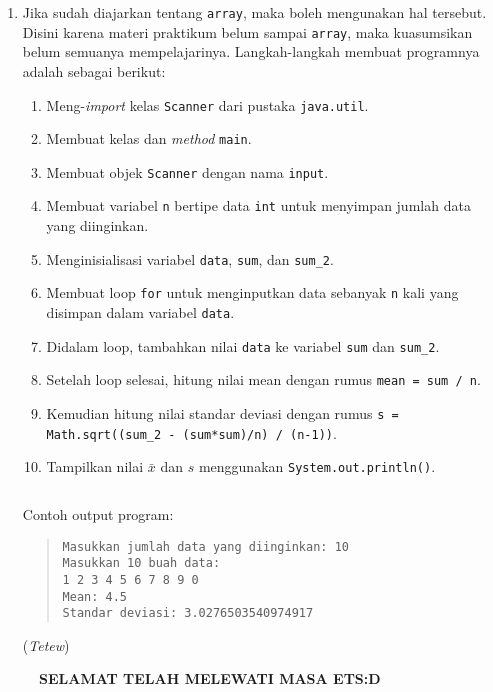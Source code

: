 \documentclass{article}
\begin{document}
\begin{enumerate}
        \item {\color{red}Jika sudah diajarkan tentang \texttt{array}, maka boleh mengunakan hal tersebut. Disini karena materi praktikum belum sampai \texttt{array}, maka kuasumsikan belum semuanya mempelajarinya}. Langkah-langkah membuat programnya adalah sebagai berikut:
        \begin{enumerate}[label=(\arabic*)]
            \item Meng-\textit{import} kelas \texttt{Scanner} dari pustaka \texttt{java.util}.
            \item Membuat kelas dan \textit{method} \texttt{main}.
            \item Membuat objek \texttt{Scanner} dengan nama \texttt{input}.
            \item Membuat variabel \texttt{n} bertipe data \texttt{int} untuk menyimpan jumlah data yang diinginkan.
            \item Menginisialisasi variabel \texttt{data}, \texttt{sum}, dan \texttt{sum\_2}.
            \item Membuat loop \texttt{for} untuk menginputkan data sebanyak \texttt{n} kali yang disimpan dalam variabel \texttt{data}.
            \item Didalam loop, tambahkan nilai \texttt{data} ke variabel \texttt{sum} dan \texttt{sum\_2}.
            \item Setelah loop selesai, hitung nilai mean dengan rumus \texttt{mean = sum / n}.
            \item Kemudian hitung nilai standar deviasi dengan rumus \texttt{s = Math.sqrt((sum\_2 - (sum*sum)/n) / (n-1))}.
            \item Tampilkan nilai $\bar{x}$ dan $s$ menggunakan \texttt{System.out.println()}.
        \end{enumerate}
        \inputminted[frame=lines,
        framesep=2mm,
        baselinestretch=1.2,
        bgcolor=bg,
        fontsize=\footnotesize,
        linenos]{java}{no5.java}
        Contoh output program:
        \begin{quote}
    \noindent\texttt{Masukkan jumlah data yang diinginkan: 10\\
    Masukkan 10 buah data:\\
    1 2 3 4 5 6 7 8 9 0\\
    Mean: 4.5\\
    Standar deviasi: 3.0276503540974917}
        \end{quote}
    \begin{flushright}
        (\textit{Tetew})
    \end{flushright}
    \end{enumerate}
    \begin{figure}[h!]
        \centering
        \caption*{\textbf{SELAMAT TELAH MELEWATI MASA ETS:D}}
    \end{figure}
\end{document}

